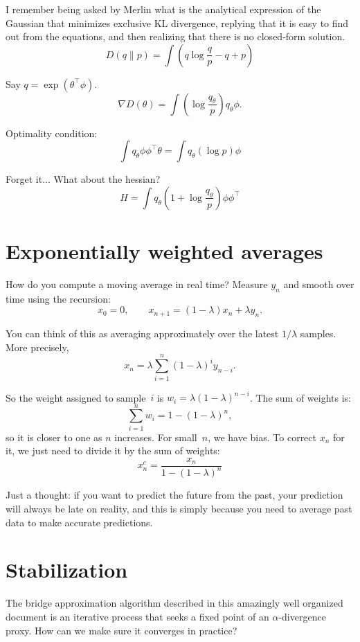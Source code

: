 \documentclass{article}
\begin{document}
I remember being asked by Merlin what is the analytical expression of the Gaussian that minimizes exclusive KL divergence, replying that it is easy to find out from the equations, and then realizing that there is no closed-form solution.
$$
D(q\|p) = \int (q \log\frac{q}{p} - q + p)
$$

Say $q=\exp(\theta^\top \phi)$. 
$$
\nabla D(\theta) = 
\int (\log\frac{q_\theta}{p}) q_\theta\phi.
$$

Optimality condition:
$$
\int q_\theta \phi \phi^\top \theta
= \int q_\theta (\log p) \phi
$$

Forget it... What about the hessian?
$$
H = \int q_\theta(1 + \log\frac{q_\theta}{p}) \phi\phi^\top 
$$


\section{Exponentially weighted averages}

How do you compute a moving average in real time? Measure $y_n$ and smooth over time using the recursion:
$$
x_0 = 0,
\qquad
x_{n+1} = (1-\lambda) x_n + \lambda y_n.
$$

You can think of this as averaging approximately over the latest $1/\lambda$ samples. More precisely,
$$
x_n = \lambda \sum_{i=1}^n (1-\lambda)^i y_{n-i}.
$$

So the weight assigned to sample~$i$ is $w_i=\lambda (1-\lambda)^{n-i}$. The sum of weights is:
$$
\sum_{i=1}^n w_i = 1 - (1-\lambda)^n,
$$
so it is closer to one as $n$ increases. For small~$n$, we have bias. To correct $x_n$ for it, we just need to divide it by the sum of weights:
$$
x_n^c = \frac{x_n}{1 - (1-\lambda)^n}
$$

Just a thought: if you want to predict the future from the past, your prediction will always be late on reality, and this is simply because you need to average past data to make accurate predictions.


\section{Stabilization}

The bridge approximation algorithm described in this amazingly well organized document is an iterative process that seeks a fixed point of an $\alpha$-divergence proxy. How can we make sure it converges in practice? 
\end{document}
